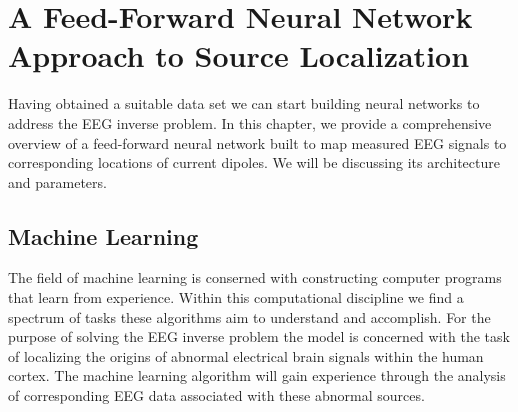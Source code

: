 \documentclass[a4paper, UKenglish, 11pt]{uiomaster}
\begin{document}
\chapter{A Feed-Forward Neural Network Approach to Source Localization}

Having obtained a suitable data set we can start building neural networks to address the EEG inverse problem. In this chapter, we provide a comprehensive overview of a feed-forward neural network built to map measured EEG signals to corresponding locations of current dipoles. We will be discussing its architecture and parameters.



%
%


\section{Machine Learning}
The field of machine learning is conserned with constructing computer programs that learn from experience. Within this computational discipline we find a spectrum of tasks these algorithms aim to understand and accomplish. For the purpose of solving the EEG inverse problem the model is concerned with the task of localizing the origins of abnormal electrical brain signals within the human cortex. The machine learning algorithm will gain experience through the analysis of corresponding EEG data associated with these abnormal sources.
\end{document}
